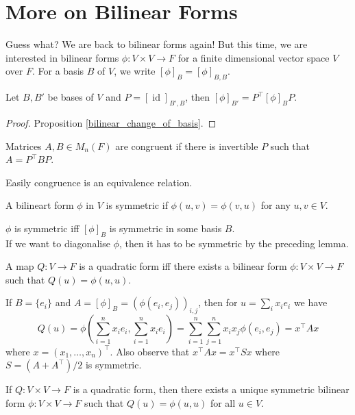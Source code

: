 \section{More on Bilinear Forms}
Guess what?
We are back to bilinear forms again!
But this time, we are interested in bilinear forms $\phi:V\times V\to F$ for a finite dimensional vector space $V$ over $F$.
For a basis $B$ of $V$, we write $[\phi]_B=[\phi]_{B,B}$.
\begin{lemma}
    Let $B,B'$ be bases of $V$ and $P=[\operatorname{id}]_{B',B}$, then $[\phi]_{B'}=P^\top[\phi]_BP$.
\end{lemma}
\begin{proof}
    Proposition \ref{bilinear_change_of_basis}.
\end{proof}
\begin{definition}
    Matrices $A,B\in M_n(F)$ are congruent if there is invertible $P$ such that $A=P^\top BP$.
\end{definition}
\begin{remark}
    Easily congruence is an equivalence relation.
\end{remark}
\begin{definition}
    A bilineart form $\phi$ in $V$ is symmetric if $\phi(u,v)=\phi(v,u)$ for any $u,v\in V$.
\end{definition}
\begin{remark}
    $\phi$ is symmetric iff $[\phi]_B$ is symmetric in some basis $B$.\\
    If we want to diagonalise $\phi$, then it has to be symmetric by the preceding lemma.
\end{remark}
\begin{definition}
    A map $Q:V\to F$ is a quadratic form iff there exists a bilinear form $\phi:V\times V\to F$ such that $Q(u)=\phi(u,u)$.
\end{definition}
\begin{remark}
    If $B=\{e_i\}$ and $A=[\phi]_B=(\phi(e_i,e_j))_{i,j}$, then for $u=\sum_ix_ie_i$ we have
    $$Q(u)=\phi\left( \sum_{i=1}^nx_ie_i,\sum_{i=1}^nx_ie_i \right)=\sum_{i=1}^n\sum_{j=1}^nx_ix_j\phi(e_i,e_j)=x^\top Ax$$
    where $x=(x_1,\ldots,x_n)^\top$.
    Also observe that $x^\top Ax=x^\top Sx$ where $S=(A+A^\top)/2$ is symmetric.
\end{remark}
\begin{proposition}
    If $Q:V\times V\to F$ is a quadratic form, then there exists a unique symmetric bilinear form $\phi:V\times V\to F$ such that $Q(u)=\phi(u,u)$ for all $u\in V$.
\end{proposition}
